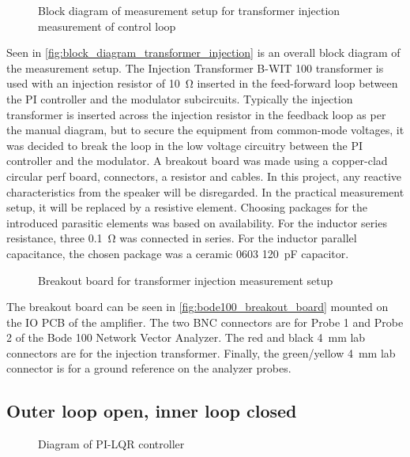 \begin{figure}[htbp]
	\centering
	\caption{Block diagram of measurement setup for transformer injection measurement of control loop}
	\label{fig:block_diagram_transformer_injection}
\end{figure}

Seen in \autoref{fig:block_diagram_transformer_injection} is an overall block diagram of the measurement setup. The Injection Transformer B-WIT 100 transformer \cite{injection_transformer_manual} is used with an injection resistor of \SI{10}{\ohm} inserted in the feed-forward loop between the PI controller and the modulator subcircuits. Typically the injection transformer is inserted across the injection resistor in the feedback loop as per the manual diagram, but to secure the equipment from common-mode voltages, it was decided to break the loop in the low voltage circuitry between the PI controller and the modulator. A breakout board was made using a copper-clad circular perf board, connectors, a resistor and cables. In this project, any reactive characteristics from the speaker will be disregarded. In the practical measurement setup, it will be replaced by a resistive element. Choosing packages for the introduced parasitic elements was based on availability. For the inductor series resistance, three \SI{0.1}{\ohm} was connected in series. For the inductor parallel capacitance, the chosen package was a ceramic 0603 \SI{120}{\pico\farad} capacitor.

\begin{figure}[htbp]
	\centering
	\caption{Breakout board for transformer injection measurement setup}
	\label{fig:bode100_breakout_board}
\end{figure}
The breakout board can be seen in \autoref{fig:bode100_breakout_board} mounted on the IO PCB of the amplifier. The two BNC connectors are for Probe 1 and Probe 2 of the Bode 100 Network Vector Analyzer. The red and black \SI{4}{\milli\meter} lab connectors are for the injection transformer. Finally, the green/yellow \SI{4}{\milli\meter} lab connector is for a ground reference on the analyzer probes.



\subsection{Outer loop open, inner loop closed}
\begin{figure}[H]
	\centering
	
	\caption{Diagram of PI-LQR controller}
	\label{fig:control_diagram_pi_lqr_controller}
\end{figure}

